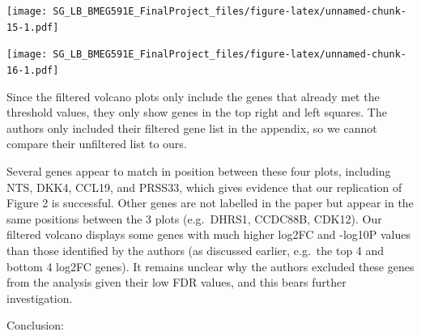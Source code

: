 \documentclass[
]{article}
\newenvironment{Shaded}{\begin{snugshade}}{\end{snugshade}}
\newcommand{\AttributeTok}[1]{\textcolor[rgb]{0.77,0.63,0.00}{#1}}
\newcommand{\CommentTok}[1]{\textcolor[rgb]{0.56,0.35,0.01}{\textit{#1}}}
\newcommand{\DecValTok}[1]{\textcolor[rgb]{0.00,0.00,0.81}{#1}}
\newcommand{\FloatTok}[1]{\textcolor[rgb]{0.00,0.00,0.81}{#1}}
\newcommand{\FunctionTok}[1]{\textcolor[rgb]{0.00,0.00,0.00}{#1}}
\newcommand{\NormalTok}[1]{#1}
\newcommand{\OtherTok}[1]{\textcolor[rgb]{0.56,0.35,0.01}{#1}}
\newcommand{\SpecialCharTok}[1]{\textcolor[rgb]{0.00,0.00,0.00}{#1}}
\newcommand{\StringTok}[1]{\textcolor[rgb]{0.31,0.60,0.02}{#1}}
\begin{document}
\texttt{[image: SG\_LB\_BMEG591E\_FinalProject\_files/figure-latex/unnamed-chunk-15-1.pdf]}

\begin{Shaded}
\end{Shaded}

\texttt{[image: SG\_LB\_BMEG591E\_FinalProject\_files/figure-latex/unnamed-chunk-16-1.pdf]}

Since the filtered volcano plots only include the genes that already met
the threshold values, they only show genes in the top right and left
squares. The authors only included their filtered gene list in the
appendix, so we cannot compare their unfiltered list to ours.

Several genes appear to match in position between these four plots,
including NTS, DKK4, CCL19, and PRSS33, which gives evidence that our
replication of Figure 2 is successful. Other genes are not labelled in
the paper but appear in the same positions between the 3 plots
(e.g.~DHRS1, CCDC88B, CDK12). Our filtered volcano displays some genes
with much higher \textbar log2FC\textbar{} and -log10P values than those
identified by the authors (as discussed earlier, e.g.~the top 4 and
bottom 4 log2FC genes). It remains unclear why the authors excluded
these genes from the analysis given their low FDR values, and this bears
further investigation.

Conclusion:
\end{document}
